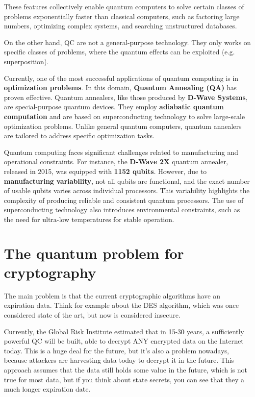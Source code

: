 These features collectively enable quantum computers to solve certain
classes of problems exponentially faster than classical computers,
such as factoring large numbers, optimizing complex systems, and
searching unstructured databases.

On the other hand, QC are not a general-purpose technology. They only
works on specific classes of problems, where the quantum effects can
be exploited (e.g. superposition). 

Currently, one of the most successful applications of quantum
computing is in \textbf{optimization problems}. In this domain,
\textbf{Quantum Annealing (QA)} has proven effective. Quantum
annealers, like those produced by \textbf{D-Wave Systems}, are
special-purpose quantum devices. They employ \textbf{adiabatic quantum
computation} and are based on superconducting technology to solve
large-scale optimization problems. Unlike general quantum computers,
quantum annealers are tailored to address specific optimization tasks.

Quantum computing faces significant challenges related to
manufacturing and operational constraints. For instance, the
\textbf{D-Wave 2X} quantum annealer, released in 2015, was equipped
with \textbf{1152 qubits}. However, due to \textbf{manufacturing
variability}, not all qubits are functional, and the exact number of
usable qubits varies across individual processors. This variability
highlights the complexity of producing reliable and consistent quantum
processors. The use of superconducting technology also introduces
environmental constraints, such as the need for ultra-low temperatures
for stable operation.

\section{The quantum problem for cryptography}
The main problem is that the current cryptographic algorithms have an
expiration data. Think for example about the DES algorithm, which was
once considered state of the art, but now is considered insecure.

Currently, the Global Risk Institute estimated that in 15-30 years, a
sufficiently powerful QC will be built, able to decrypt ANY encrypted
data on the Internet today. This is a huge deal for the future, but
it's also a problem nowadays, because attackers are harvesting data
today to decrypt it in the future. This approach assumes that the data
still holds some value in the future, which is not true for most data,
but if you think about state secrets, you can see that they a much
longer expiration date. 


